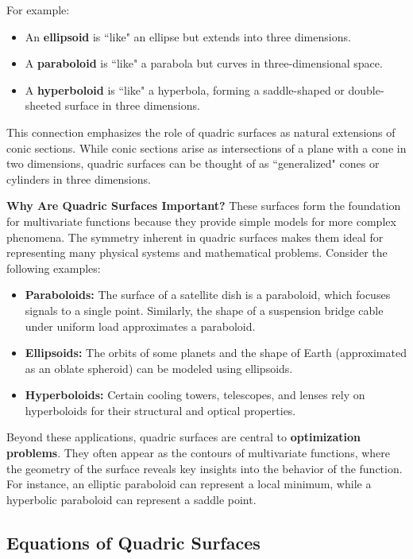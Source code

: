 \noindent For example:
\begin{itemize}
    \item An \textbf{ellipsoid} is ``like" an ellipse but extends into three dimensions.
    \item A \textbf{paraboloid} is ``like" a parabola but curves in three-dimensional space.
    \item A \textbf{hyperboloid} is ``like" a hyperbola, forming a saddle-shaped or double-sheeted surface in three dimensions.
\end{itemize}

\noindent This connection emphasizes the role of quadric surfaces as natural extensions of conic sections. While conic sections arise as intersections of a plane with a cone in two dimensions, quadric surfaces can be thought of as ``generalized" cones or cylinders in three dimensions.

\noindent \textbf{Why Are Quadric Surfaces Important?} These surfaces form the foundation for multivariate functions because they provide simple models for more complex phenomena. The symmetry inherent in quadric surfaces makes them ideal for representing many physical systems and mathematical problems. Consider the following examples:
\begin{itemize}
    \item \textbf{Paraboloids:} The surface of a satellite dish is a paraboloid, which focuses signals to a single point. Similarly, the shape of a suspension bridge cable under uniform load approximates a paraboloid.
    \item \textbf{Ellipsoids:} The orbits of some planets and the shape of Earth (approximated as an oblate spheroid) can be modeled using ellipsoids.
    \item \textbf{Hyperboloids:} Certain cooling towers, telescopes, and lenses rely on hyperboloids for their structural and optical properties.
\end{itemize}

\noindent Beyond these applications, quadric surfaces are central to \textbf{optimization problems}. They often appear as the contours of multivariate functions, where the geometry of the surface reveals key insights into the behavior of the function. For instance, an elliptic paraboloid can represent a local minimum, while a hyperbolic paraboloid can represent a saddle point.


\subsection*{Equations of Quadric Surfaces}

